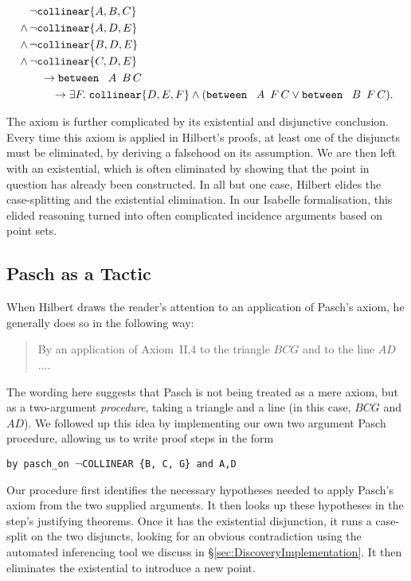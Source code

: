 \begin{align*}
&\neg\texttt{collinear}\{A, B, C\}\\
\wedge\,&\neg\texttt{collinear}\{A, D, E\}\\
\wedge\,&\neg\texttt{collinear}\{B, D, E\}\\
\wedge\,&\neg\texttt{collinear}\{C, D, E\}\\
&\quad\rightarrow\texttt{between}\ \,\ A\ \,B\,C \\
&\qquad\rightarrow\exists F.\; \texttt{collinear} \{D, E, F\} \wedge (\texttt{between}\ \,\ A\ \,F\,C \vee \texttt{between}\ \,\ B\ \,F\,C).
\end{align*}

The axiom is further complicated by its existential and disjunctive conclusion. Every time this axiom is applied in Hilbert's proofs, at least one of the disjuncts must be eliminated, by deriving a falsehood on its assumption. We are then left with an existential, which is often eliminated by showing that the point in question has already been constructed. In all but one case, Hilbert elides the case-splitting and the existential elimination. In our Isabelle formalisation, this elided reasoning turned into often complicated incidence arguments based on point sets.

\subsection{Pasch as a Tactic}
When Hilbert draws the reader's attention to an application of Pasch's axiom, he generally does so in the following way:
\begin{quote}By an application of Axiom~II,4 to the triangle $BCG$ and to the line $AD$....\end{quote}

The wording here suggests that Pasch is not being treated as a mere axiom, but as a two-argument \emph{procedure}, taking a triangle and a line (in this case, $BCG$ and $AD$). We followed up this idea by implementing our own two argument Pasch procedure, allowing us to write proof steps in the form

\vspace{0.5cm}
\texttt{\qquad\qquad by pasch\_on $\neg$COLLINEAR \{B, C, G\} and A,D}
\vspace{0.5cm}

Our procedure first identifies the necessary hypotheses needed to apply Pasch's axiom from the two supplied arguments. It then looks up these hypotheses in the step's justifying theorems. Once it has the existential disjunction, it runs a case-split on the two disjuncts, looking for an obvious contradiction using the automated inferencing tool we discuss in \S\ref{sec:DiscoveryImplementation}. It then eliminates the existential to introduce a new point.

